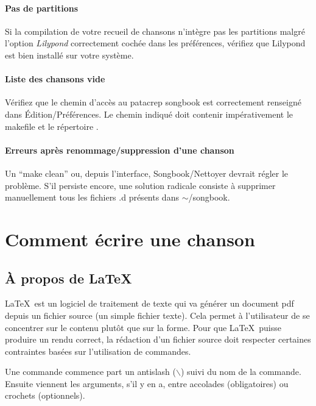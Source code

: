 \documentclass[versionenligne]{patacrep}
\begin{document}
\paragraph{Pas de partitions}
Si la compilation de votre recueil de chansons n'intègre pas les
partitions malgré l'option \emph{Lilypond} correctement cochée dans les
préférences, vérifiez que Lilypond est bien installé sur votre système. 

\paragraph{Liste des chansons vide} 
Vérifiez que le chemin d'accès au patacrep songbook est correctement
renseigné dans Édition/Préférences.  Le chemin indiqué doit contenir
impérativement le makefile et le répertoire .

\paragraph{Erreurs après renommage/suppression d'une chanson} 
Un ``make clean'' ou, depuis l'interface, Songbook/Nettoyer devrait
régler le problème. S'il persiste encore, une solution radicale
consiste à supprimer manuellement tous les fichiers .d présents dans
$\sim$/songbook.


\section{Comment écrire une chanson}

\subsection{À propos de \LaTeX\,}

\LaTeX\, est un logiciel de traitement de texte qui va générer un
document pdf depuis un fichier source (un simple fichier texte). Cela
permet à l'utilisateur de se concentrer sur le contenu plutôt que sur
la forme. Pour que \LaTeX\, puisse produire un rendu correct, la
rédaction d'un fichier source doit respecter certaines contraintes
basées sur l'utilisation de commandes.

Une commande commence part un antislash ($\backslash$) suivi du nom
de la commande. Ensuite viennent les arguments, s'il y en a, entre
accolades (obligatoires) ou crochets (optionnels).
\end{document}
